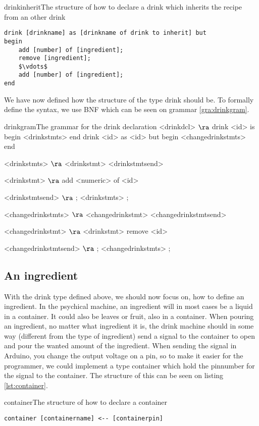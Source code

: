 \begin{code}{drinkinherit}{The structure of how to declare a drink which inherits the recipe from an other drink}
\begin{lstlisting}[mathescape]
drink [drinkname] as [drinkname of drink to inherit] but
begin
	add [number] of [ingredient];
	remove [ingredient];
	$\vdots$
	add [number] of [ingredient];
end
\end{lstlisting}
\end{code}

We have now defined how the structure of the type drink should be. To formally define the syntax, we use BNF which can be seen on grammar \ref{gra:drinkgram}.

\begin{grammatik}{drinkgram}{The grammar for the drink declaration}
<drinkdcl> $\ra$ drink <id> is begin <drinkstmts> end
\alt drink <id> as <id> but begin <changedrinkstmts> end

<drinkstmts> $\ra$ <drinkstmt> <drinkstmtsend>

<drinkstmt> $\ra$ add <numeric> of <id>

<drinkstmtsend> $\ra$ ; <drinkstmts>
\alt ;

<changedrinkstmts> $\ra$ <changedrinkstmt> <changedrinkstmtsend>

<changedrinkstmt> $\ra$ <drinkstmt>
\alt remove <id>

<changedrinkstmtsend> $\ra$ ; <changedrinkstmts>
\alt ;
\end{grammatik}

\subsection{An ingredient}
With the drink type defined above, we should now focus on, how to define an ingredient. In the psychical machine, an ingredient will in most cases be a liquid in a container. It could also be leaves or fruit, also in a container. When pouring an ingredient, no matter what ingredient it is, the drink machine should in some way (different from the type of ingredient) send a signal to the container to open and pour the wanted amount of the ingredient. When sending the signal in Arduino, you change the output voltage on a pin, so to make it easier for the programmer, we could implement a type container which hold the pinnumber for the signal to the container. The structure of this can be seen on listing \ref{lst:container}.

\begin{code}{container}{The structure of how to declare a container}
\begin{lstlisting}[mathescape]
container [containername] <-- [containerpin]
\end{lstlisting}
\end{code}

